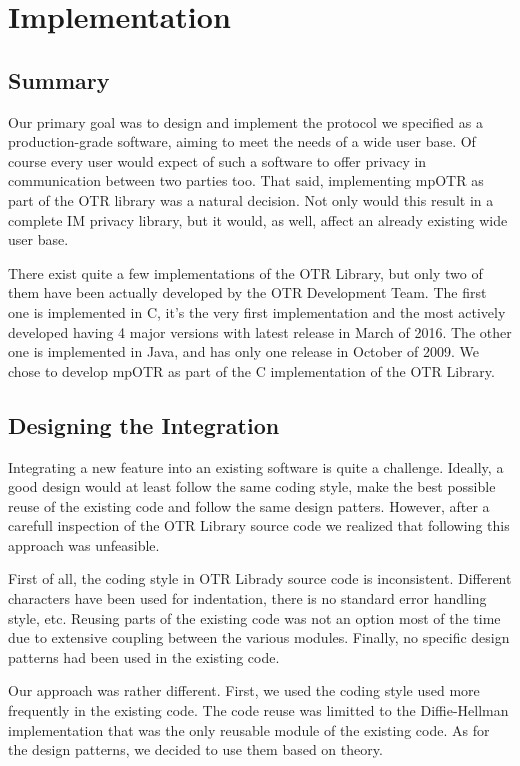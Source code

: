 \chapter{Implementation}
\label{chapters:implementation}


\section{Summary}
Our primary goal was to design and implement the protocol we specified as a production-grade software, aiming to meet the needs of a wide user base. Of course every user would expect of such a software to offer privacy in communication between two parties too. That said, implementing mpOTR as part of the OTR library was a natural decision. Not only would this result in a complete IM privacy library, but it would, as well, affect an already existing wide user base.

There exist quite a few implementations of the OTR Library, but only two of them have been actually developed by the OTR Development Team. The first one is implemented in C, it's the very first implementation and the most actively developed having 4 major versions with latest release in March of 2016. The other one is implemented in Java, and has only one release in October of 2009. We chose to develop mpOTR as part of the C implementation of the OTR Library.


\section{Designing the Integration}
Integrating a new feature into an existing software is quite a challenge. Ideally, a good design would at least follow the same coding style, make the best possible reuse of the existing code and follow the same design patters. However, after a carefull inspection of the OTR Library source code we realized that following this approach was unfeasible.

First of all, the coding style in OTR Librady source code is inconsistent. Different characters have been used for indentation, there is no standard error handling style, etc. Reusing parts of the existing code was not an option most of the time due to extensive coupling between the various modules. Finally, no specific design patterns had been used in the existing code.

Our approach was rather different. First, we used the coding style used more frequently in the existing code. The code reuse was limitted to the Diffie-Hellman implementation that was the only reusable module of the existing code. As for the design patterns, we decided to use them based on theory.


